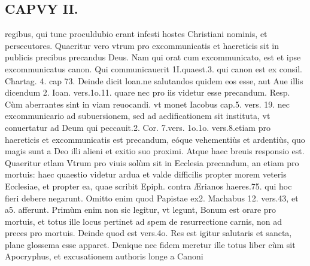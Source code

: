 \documentclass{article}
\begin{document}
\begin{pages}
\section*{CAPVY II. }
\marginpar{[ p.45 ]}\pstart regibus, qui tunc proculdubio erant infesti hostes Christiani nominis, et persecutores.  \pend\pstart Quaeritur vero vtrum pro excommunicatis et haereticis sit in publicis precibus precandus Deus. Nam qui orat cum excommunicato, est et ipse excommunicatus canon. Qui communicauerit 1I.quaest.3. qui canon est ex consil. Chartag. 4. cap 73. Deinde dicit loan.ne salutandos quidem eos esse, aut Aue illis dicendum 2. Ioan. vers.1o.11. quare nec pro iis videtur esse precandum. Resp. Cùm aberrantes sint in viam reuocandi. vt monet Iacobus cap.5. vers. 19. nec excommunicario ad subuersionem, sed ad aedificationem sit instituta, vt conuertatur ad Deum qui peccauit.2. Cor. 7.vers. 1o.1o. vers.8.etiam pro haereticis et excommunicatis est precandum, eóque vehementiùs et ardentiùs, quo magis sunt a Deo illi alieni et exitio suo proximi. Atque haec breuis responsio est.  \pend\pstart Quaeritur etlam Vtrum pro viuis solùm sit in Ecclesia precandum, an etiam pro mortuis: haec quaestio videtur ardua et valde difficilis propter morem veteris Ecclesiae, et propter ea, quae scribit Epiph. contra Ærianos haeres.75. qui hoc fieri debere negarunt. Omitto enim quod Papistae ex2. Machabus  12. vers.43, et a5. afferunt. Primùm enim non sic legitur, vt legunt, Bonum est orare pro mortuis, et totus ille locus pertinet ad spem de resurrectione carnis, non ad preces pro mortuis. Deinde quod est vers.4o. Res est igitur salutaris et sancta, plane glossema esse apparet. Denique nec fidem meretur ille totus liber cùm sit Apocryphus, et excusationem authoris longe a Canoni\pend

\end{pages}
\end{document}

